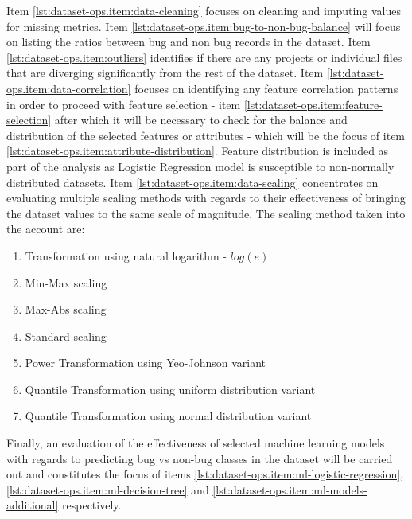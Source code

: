 Item \ref{lst:dataset-ops.item:data-cleaning} focuses on cleaning and imputing values for missing metrics. Item \ref{lst:dataset-ops.item:bug-to-non-bug-balance} will focus on listing the ratios between bug and non bug records in the dataset.
Item \ref{lst:dataset-ops.item:outliers} identifies if there are any projects or individual files that are diverging significantly from the rest of the dataset. 
Item \ref{lst:dataset-ops.item:data-correlation} focuses on identifying any feature correlation patterns in order to proceed with feature selection - item  \ref{lst:dataset-ops.item:feature-selection} after which it will be necessary to check for the balance and distribution of the selected features or attributes - which will be the focus of item \ref{lst:dataset-ops.item:attribute-distribution}. Feature distribution is included as part of the analysis as Logistic Regression model is susceptible to non-normally distributed datasets.
Item \ref{lst:dataset-ops.item:data-scaling} concentrates on evaluating multiple scaling methods with regards to their effectiveness of bringing the dataset values to the same scale of magnitude. The scaling method taken into the account are:
\begin{enumerate}
    \item Transformation using natural logarithm - $log(e)$ 
    \item Min-Max scaling
    \item Max-Abs scaling
    \item Standard scaling
    \item Power Transformation using Yeo-Johnson variant
    \item Quantile Transformation using uniform distribution variant
    \item Quantile Transformation using normal distribution variant
\end{enumerate}

Finally, an evaluation of the effectiveness of selected machine learning models with regards to predicting bug vs non-bug classes in the dataset will be carried out and constitutes the focus of items \ref{lst:dataset-ops.item:ml-logistic-regression}, \ref{lst:dataset-ops.item:ml-decision-tree} and \ref{lst:dataset-ops.item:ml-models-additional} respectively.

